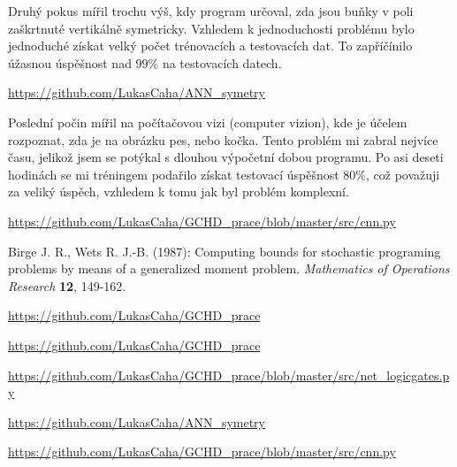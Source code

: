 \documentclass[12pt,a4paper]{report}
\begin{document}
Druhý pokus mířil trochu výš, kdy program určoval, zda jsou buňky v poli zaškrtnuté vertikálně symetricky. Vzhledem k jednoduchosti problému bylo jednoduché získat velký počet trénovacích a testovacích dat. To zapříčínilo úžasnou úspěšnost nad $99\%$ na testovacích datech. 

\url{https://github.com/LukasCaha/ANN_symetry}

Poslední počin mířil na počítačovou vizi (computer vizion), kde je účelem rozpoznat, zda je na obrázku pes, nebo kočka. Tento problém mi zabral nejvíce času, jelikož jsem se potýkal s dlouhou výpočetní dobou programu. Po asi deseti hodinách se mi tréningem podařilo získat testovací úspěšnost $80\%$, což považuji za veliký úspěch, vzhledem k tomu jak byl problém komplexní. 

\url{https://github.com/LukasCaha/GCHD_prace/blob/master/src/cnn.py}



\begin{thebibliography}{99}

Birge J. R., Wets R. J.-B. (1987): Computing bounds for stochastic programing problems by means of a generalized moment problem. \textit{Mathematics of Operations Research} \textbf{12}, 149-162.
\end{thebibliography}

\begin{thebibliography}{99}
	
	  \url{https://github.com/LukasCaha/GCHD_prace}
\end{thebibliography}
\noindent\url{https://github.com/LukasCaha/GCHD_prace}

\noindent\url{https://github.com/LukasCaha/GCHD_prace/blob/master/src/net_logicgates.py}

\noindent\url{https://github.com/LukasCaha/ANN_symetry}

\noindent\url{https://github.com/LukasCaha/GCHD_prace/blob/master/src/cnn.py}
\openright
\end{document}
